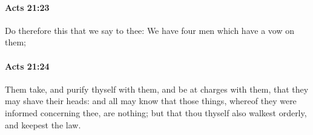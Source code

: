		\paragraph{Acts 21:23} %
			\label{ACTS-21-23}

			Do therefore this that we say to thee: We have four men which have a vow on them;

			\begin{framed}
			\scriptsize
				\begin{compactdesc}
					\item[SBLG] 
				\end{compactdesc}
			\end{framed}

		\paragraph{Acts 21:24} %
			\label{ACTS-21-24}

			Them take, and purify thyself with them, and be at charges with them, that they may shave their heads: and all may know that those things, whereof they were informed concerning thee, are nothing; but that thou thyself also walkest orderly, and keepest the law.

